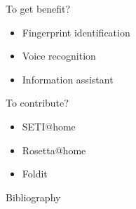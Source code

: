 \documentclass[first=dgreen,second=purple,logo=yellowexc]{aaltoslides}
\begin{document}
{\begin{frame}{To get benefit?}
	\begin{itemize}
		\item Fingerprint identification
		\item Voice recognition
		\item Information assistant
	\end{itemize}
\end{frame}


\begin{frame}{To contribute?}
	\begin{itemize}
		\item SETI@home
		\item Rosetta@home
		\item Foldit
	\end{itemize}
\end{frame}










\begin{frame}[allowframebreaks]{Bibliography}
%

 
\end{frame}

}
\end{document}
